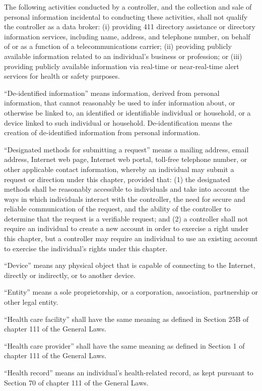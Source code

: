 The following activities conducted by a controller, and the collection and sale of personal information incidental to conducting these activities, shall not qualify the controller as a data broker: (i) providing 411 directory assistance or directory information services, including name, address, and telephone number, on behalf of or as a function of a telecommunications carrier; (ii) providing publicly available information related to an individual’s business or profession; or (iii) providing publicly available information via real-time or near-real-time alert services for health or safety purposes.

“De-identified information” means information, derived from personal information, that cannot reasonably be used to infer information about, or otherwise be linked to, an identified or identifiable individual or household, or a device linked to such individual or household. De-identification means the creation of de-identified information from personal information.

“Designated methods for submitting a request” means a mailing address, email address, Internet web page, Internet web portal, toll-free telephone number, or other applicable contact information, whereby an individual may submit a request or direction under this chapter, provided that: (1) the designated methods shall be reasonably accessible to individuals and take into account the ways in which individuals interact with the controller, the need for secure and reliable communication of the request, and the ability of the controller to determine that the request is a verifiable request; and (2) a controller shall not require an individual to create a new account in order to exercise a right under this chapter, but a controller may require an individual to use an existing account to exercise the individual’s rights under this chapter.

“Device” means any physical object that is capable of connecting to the Internet, directly or indirectly, or to another device.

“Entity” means a sole proprietorship, or a corporation, association, partnership or other legal entity.

“Health care facility” shall have the same meaning as defined in Section 25B of chapter 111 of the General Laws.

“Health care provider” shall have the same meaning as defined in Section 1 of chapter 111 of the General Laws.

“Health record” means an individual’s health-related record, as kept pursuant to Section 70 of chapter 111 of the General Laws.

